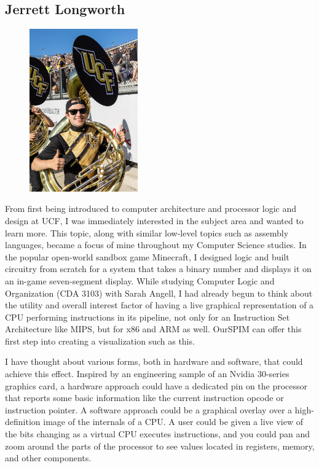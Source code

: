 \documentclass[parskip=half, fontsize=12pt]{scrartcl}
\begin{document}
\subsection{Jerrett Longworth}
\begin{figure}[H]
    \centering
    \includegraphics[height=7cm]{profile-jerrett}
\end{figure}

From first being introduced to computer architecture and processor logic and design at UCF, I was immediately interested in the subject area and wanted to learn more. This topic, along with similar low-level topics such as assembly languages, became a focus of mine throughout my Computer Science studies. In the popular open-world sandbox game Minecraft, I designed logic and built circuitry from scratch for a system that takes a binary number and displays it on an in-game seven-segment display. While studying Computer Logic and Organization (CDA 3103) with Sarah Angell, I had already begun to think about the utility and overall interest factor of having a live graphical representation of a CPU performing instructions in its pipeline, not only for an Instruction Set Architecture like MIPS, but for x86 and ARM as well. OurSPIM can offer this first step into creating a visualization such as this.

I have thought about various forms, both in hardware and software, that could achieve this effect. Inspired by an engineering sample of an Nvidia 30-series graphics card, a hardware approach could have a dedicated pin on the processor that reports some basic information like the current instruction opcode or instruction pointer. A software approach could be a graphical overlay over a high-definition image of the internals of a CPU. A user could be given a live view of the bits changing as a virtual CPU executes instructions, and you could pan and zoom around the parts of the processor to see values located in registers, memory, and other components.
\end{document}

